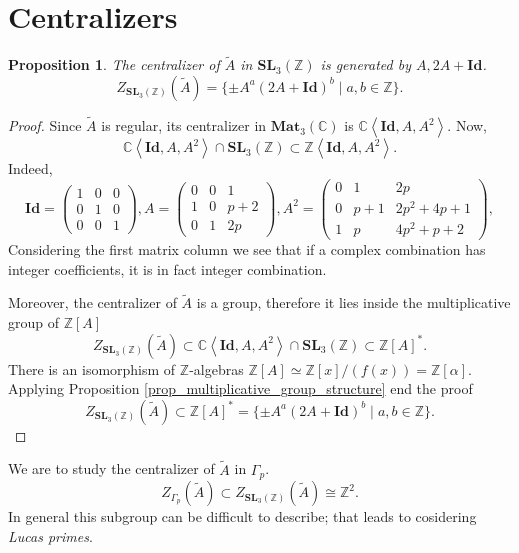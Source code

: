 \documentclass[a4paper]{article}
\newtheorem{Prop}[Thm]{Proposition}
\newcommand{\C}{\mathbb{C}}        %
\newcommand{\Id}{\mathbf{Id}}        %
\newcommand{\SL}{\mathbf{SL}_3(\mathbb{Z})}        %
\newcommand{\Mat}{\mathbf{Mat}_3(\mathbb{C})}        %
\newcommand{\SLp}{\Gamma_p}        %
\begin{document}
\section{Centralizers}
\begin{Prop}
	\label{proposition_centralizer_in_sl}
The centralizer of $\tilde A$ in $\SL$
is generated by $A, 2 A+\Id$.
$$Z_{\SL}(\tilde A) = \{ \pm A^a (2 A + \Id)^b \mid a, b \in \mathbb{Z} \} .$$ 
\end{Prop}
\begin{proof}
Since $\tilde A$ is regular, its centralizer in $ \Mat $ is $\C \left< \Id, A, A^2 \right> $.
Now, 
\[
\C \left< \Id, A, A^2 \right> \cap \SL 
\subset \mathbb{Z} 
\left< \Id, A, A^2 \right>
.\] 
Indeed,
\begin{equation}
\Id = 
\begin{pmatrix}
1 & 0 & 0 \\
0 & 1 & 0 \\
0 & 0 & 1
\end{pmatrix}, 
A = 
\begin{pmatrix}
0 & 0 & 1 \\
1 & 0 & p+2 \\
0 & 1 & 2p
\end{pmatrix}, 
A^2 = 
\begin{pmatrix}
0 & 1 & 2p \\
0 & p+1 & 2p^2+4p+1 \\
1 & p & 4p^2+p+2
\end{pmatrix}, 
\end{equation}
Considering the first matrix column we see that if a complex combination has integer coefficients, it is in fact integer combination.

Moreover, 
the centralizer of $\tilde A$ is a group, therefore it lies inside the multiplicative group of $\mathbb{Z}[A]$
\[
Z_{\SL}(\tilde A)  \subset 
\C \left< \Id, A, A^2 \right> \cap \SL 
\subset \mathbb{Z}[A]^*
.\] 
There is an isomorphism of $\mathbb{Z}$-algebras $\mathbb{Z}[A] \simeq \mathbb{Z}[x]/(f(x)) = \mathbb{Z}[\alpha]$.
Applying Proposition \ref{prop_multiplicative_group_structure} end the proof
\[
Z_{\SL}(\tilde A) 
\subset \mathbb{Z}[A]^* =\{ \pm A^a (2 A + \Id)^b \mid a, b \in \mathbb{Z} \}.\] 
\end{proof}

We are to study the centralizer of $\tilde A$ in $\SLp$.
\[
Z_{\SLp}(\tilde A) \subset 
Z_{\SL}(\tilde A) \cong \mathbb{Z}^2
.\] 
In general this subgroup can be difficult to describe; 
that leads to cosidering \emph{Lucas primes}.
\end{document}
